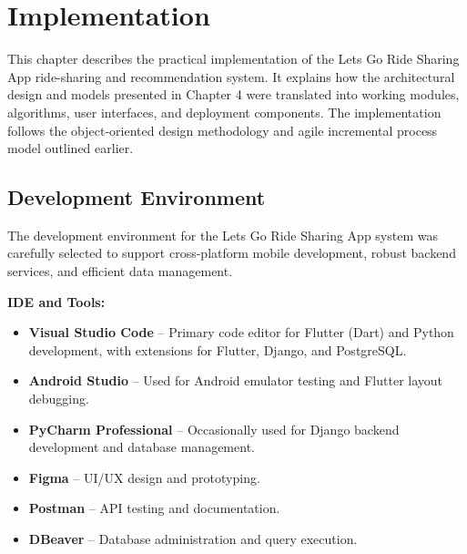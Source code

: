
\chapter{Implementation}

This chapter describes the practical implementation of the Lets Go Ride Sharing App ride-sharing and recommendation system. It explains how the architectural design and models presented in Chapter 4 were translated into working modules, algorithms, user interfaces, and deployment components. The implementation follows the object-oriented design methodology and agile incremental process model outlined earlier.


\section{Development Environment}

The development environment for the Lets Go Ride Sharing App system was carefully selected to support cross-platform mobile development, robust backend services, and efficient data management.

\textbf{IDE and Tools:}
\begin{itemize}
    \item \textbf{Visual Studio Code} – Primary code editor for Flutter (Dart) and Python development, with extensions for Flutter, Django, and PostgreSQL.
    \item \textbf{Android Studio} – Used for Android emulator testing and Flutter layout debugging.
    \item \textbf{PyCharm Professional} – Occasionally used for Django backend development and database management.
    \item \textbf{Figma} – UI/UX design and prototyping.
    \item \textbf{Postman} – API testing and documentation.
    \item \textbf{DBeaver} – Database administration and query execution.
\end{itemize}


